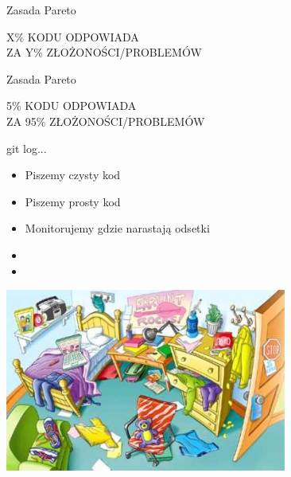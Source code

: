 \documentclass{beamer}
\begin{document}
\begin{frame}{Zasada Pareto}
\begin{center}
\Large{{\color{red}X\%} KODU ODPOWIADA\\
ZA {\color{red}Y\%} ZŁOŻONOŚCI/PROBLEMÓW}
\end{center}
\end{frame}

\begin{frame}{Zasada Pareto}
\begin{center}
\Large{{\color{red}5\%} KODU ODPOWIADA\\
ZA {\color{red}95\%} ZŁOŻONOŚCI/PROBLEMÓW}
\end{center}
\end{frame}

\begin{frame}{}
\begin{center}
\Large{git log...}
\end{center}
\end{frame}

\begin{frame}{}
     \begin{Large}
	\begin{itemize}
		\item Piszemy czysty kod
		\item Piszemy prosty kod
		\item Monitorujemy gdzie narastają odsetki
		\item 
		\item 
	\end{itemize}
     \end{Large}
\end{frame}

\begin{frame}{}
\begin{center}
  	\includegraphics[height=6cm]{mess.jpeg}
\end{center}
\end{frame}
\end{document}
